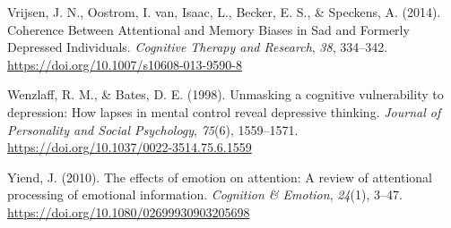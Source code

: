 \documentclass[
  english,
  man,floatsintext]{apa6}
\begin{document}
\leavevmode\hypertarget{ref-Vrijsen2014}{}%
Vrijsen, J. N., Oostrom, I. van, Isaac, L., Becker, E. S., \& Speckens, A. (2014). Coherence Between Attentional and Memory Biases in Sad and Formerly Depressed Individuals. \emph{Cognitive Therapy and Research}, \emph{38}, 334--342. \url{https://doi.org/10.1007/s10608-013-9590-8}

\leavevmode\hypertarget{ref-Wenzlaff1998}{}%
Wenzlaff, R. M., \& Bates, D. E. (1998). Unmasking a cognitive vulnerability to depression: How lapses in mental control reveal depressive thinking. \emph{Journal of Personality and Social Psychology}, \emph{75}(6), 1559--1571. \url{https://doi.org/10.1037/0022-3514.75.6.1559}

\leavevmode\hypertarget{ref-Yiend2010}{}%
Yiend, J. (2010). The effects of emotion on attention: A review of attentional processing of emotional information. \emph{Cognition \& Emotion}, \emph{24}(1), 3--47. \url{https://doi.org/10.1080/02699930903205698}

\endgroup
\end{document}
